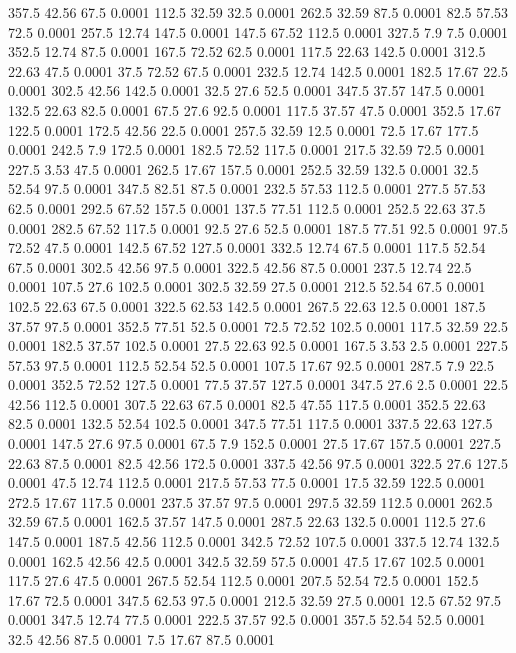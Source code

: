 357.5	42.56	67.5	0.0001
112.5	32.59	32.5	0.0001
262.5	32.59	87.5	0.0001
82.5	57.53	72.5	0.0001
257.5	12.74	147.5	0.0001
147.5	67.52	112.5	0.0001
327.5	7.9	7.5	0.0001
352.5	12.74	87.5	0.0001
167.5	72.52	62.5	0.0001
117.5	22.63	142.5	0.0001
312.5	22.63	47.5	0.0001
37.5	72.52	67.5	0.0001
232.5	12.74	142.5	0.0001
182.5	17.67	22.5	0.0001
302.5	42.56	142.5	0.0001
32.5	27.6	52.5	0.0001
347.5	37.57	147.5	0.0001
132.5	22.63	82.5	0.0001
67.5	27.6	92.5	0.0001
117.5	37.57	47.5	0.0001
352.5	17.67	122.5	0.0001
172.5	42.56	22.5	0.0001
257.5	32.59	12.5	0.0001
72.5	17.67	177.5	0.0001
242.5	7.9	172.5	0.0001
182.5	72.52	117.5	0.0001
217.5	32.59	72.5	0.0001
227.5	3.53	47.5	0.0001
262.5	17.67	157.5	0.0001
252.5	32.59	132.5	0.0001
32.5	52.54	97.5	0.0001
347.5	82.51	87.5	0.0001
232.5	57.53	112.5	0.0001
277.5	57.53	62.5	0.0001
292.5	67.52	157.5	0.0001
137.5	77.51	112.5	0.0001
252.5	22.63	37.5	0.0001
282.5	67.52	117.5	0.0001
92.5	27.6	52.5	0.0001
187.5	77.51	92.5	0.0001
97.5	72.52	47.5	0.0001
142.5	67.52	127.5	0.0001
332.5	12.74	67.5	0.0001
117.5	52.54	67.5	0.0001
302.5	42.56	97.5	0.0001
322.5	42.56	87.5	0.0001
237.5	12.74	22.5	0.0001
107.5	27.6	102.5	0.0001
302.5	32.59	27.5	0.0001
212.5	52.54	67.5	0.0001
102.5	22.63	67.5	0.0001
322.5	62.53	142.5	0.0001
267.5	22.63	12.5	0.0001
187.5	37.57	97.5	0.0001
352.5	77.51	52.5	0.0001
72.5	72.52	102.5	0.0001
117.5	32.59	22.5	0.0001
182.5	37.57	102.5	0.0001
27.5	22.63	92.5	0.0001
167.5	3.53	2.5	0.0001
227.5	57.53	97.5	0.0001
112.5	52.54	52.5	0.0001
107.5	17.67	92.5	0.0001
287.5	7.9	22.5	0.0001
352.5	72.52	127.5	0.0001
77.5	37.57	127.5	0.0001
347.5	27.6	2.5	0.0001
22.5	42.56	112.5	0.0001
307.5	22.63	67.5	0.0001
82.5	47.55	117.5	0.0001
352.5	22.63	82.5	0.0001
132.5	52.54	102.5	0.0001
347.5	77.51	117.5	0.0001
337.5	22.63	127.5	0.0001
147.5	27.6	97.5	0.0001
67.5	7.9	152.5	0.0001
27.5	17.67	157.5	0.0001
227.5	22.63	87.5	0.0001
82.5	42.56	172.5	0.0001
337.5	42.56	97.5	0.0001
322.5	27.6	127.5	0.0001
47.5	12.74	112.5	0.0001
217.5	57.53	77.5	0.0001
17.5	32.59	122.5	0.0001
272.5	17.67	117.5	0.0001
237.5	37.57	97.5	0.0001
297.5	32.59	112.5	0.0001
262.5	32.59	67.5	0.0001
162.5	37.57	147.5	0.0001
287.5	22.63	132.5	0.0001
112.5	27.6	147.5	0.0001
187.5	42.56	112.5	0.0001
342.5	72.52	107.5	0.0001
337.5	12.74	132.5	0.0001
162.5	42.56	42.5	0.0001
342.5	32.59	57.5	0.0001
47.5	17.67	102.5	0.0001
117.5	27.6	47.5	0.0001
267.5	52.54	112.5	0.0001
207.5	52.54	72.5	0.0001
152.5	17.67	72.5	0.0001
347.5	62.53	97.5	0.0001
212.5	32.59	27.5	0.0001
12.5	67.52	97.5	0.0001
347.5	12.74	77.5	0.0001
222.5	37.57	92.5	0.0001
357.5	52.54	52.5	0.0001
32.5	42.56	87.5	0.0001
7.5	17.67	87.5	0.0001
